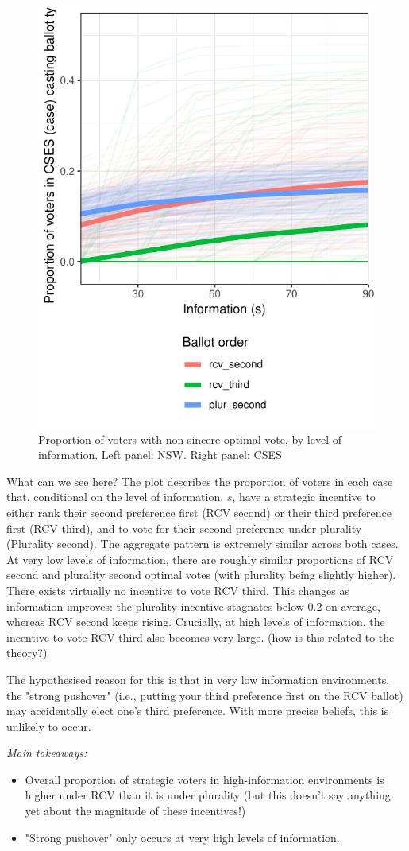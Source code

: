 \documentclass[12pt, letter, margin = 1.5 in]{article}
\begin{document}
\begin{figure}[!h]
	\centering
	\includegraphics[width = .6 \textwidth]{../output/figures/cses_freq.pdf}
	\caption{Proportion of voters with non-sincere optimal vote, by level of information. Left panel: NSW. Right panel: CSES}
	\label{fig:sv_prop}
\end{figure}

What can we see here? The plot describes the proportion of voters in each case that, conditional on the level of information, $s$, have a strategic incentive to either rank their second preference first (RCV second) or their third preference first (RCV third), and to vote for their second preference under plurality (Plurality second).
The aggregate pattern is extremely similar across both cases. At very low levels of information, there are roughly similar proportions of RCV second and plurality second optimal votes (with plurality being slightly higher). There exists virtually no incentive to vote RCV third. This changes as information improves: the plurality incentive stagnates below 0.2 on average, whereas RCV second keeps rising. Crucially, at high levels of information, the incentive to vote RCV third also becomes very large. (how is this related to the theory?)

The hypothesised reason for this is that in very low information environments, the "strong pushover" (i.e., putting your third preference first on the RCV ballot) may accidentally elect one's third preference. With more precise beliefs, this is unlikely to occur.

\textit{Main takeaways:}
\begin{itemize}
\item Overall proportion of strategic voters in high-information environments is higher under RCV than it is under plurality (but this doesn't say anything yet about the magnitude of these incentives!)
\item "Strong pushover" only occurs at very high levels of information.
\end{itemize}
\end{document}
